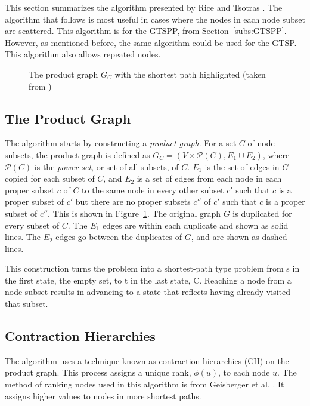 \documentclass{sig-alternate}
\begin{document}
This section summarizes the algorithm presented by Rice and Tsotras \cite{Rice:2013}. The algorithm that follows is most useful in cases where the nodes in each node subset are scattered. This algorithm is for the GTSPP, from Section~\ref{subs:GTSPP}. However, as mentioned before, the same algorithm could be used for the GTSP. This algorithm also allows repeated nodes. 


\begin{figure}
\centering
{}
\caption{The product graph $G_{C}$ with the shortest path highlighted (taken from \cite{Rice:2013})}
\label{fig:productgraph}
\end{figure}

\subsection{The Product Graph}
\label{subs:productgraph}
The algorithm starts by constructing a \textit{product graph}. 
For a set $C$ of node subsets, the product graph is defined as $G_{C}=(V \times \mathcal{P}(C), E_{1} \cup E_{2})$, where $\mathcal{P}(C)$ is the \textit{power set}, or set of all subsets, of $C$. $E_{1}$ is the set of edges in $G$ copied for each subset of $C$, and $E_{2}$ is a set of edges from each node in each proper subset $c$ of $C$ to the same node in every other subset $c'$ such that $c$ is a proper subset of $c'$ but there are no proper subsets $c''$ of $c'$ such that $c$ is a proper subset of $c''$. This is shown in Figure~\ref{fig:productgraph}. The original graph $G$ is duplicated for every subset of $C$. The $E_{1}$ edges are within each duplicate and shown as solid lines. The $E_{2}$ edges go between the duplicates of $G$, and are shown as dashed lines. 

This construction turns the problem into a shortest-path type problem from s in the first state, the empty set, to t in the last state, C. Reaching a node from a node subset results in advancing to a state that reflects having already visited that subset. 

\subsection{Contraction Hierarchies}
\label{subs:CH}
The algorithm uses a technique known as contraction hierarchies (CH) on the product graph. This process assigns a unique rank, $\phi(u)$, to each node $u$. The method of ranking nodes used in this algorithm is from Geisberger et al. \cite{geisberger:2008}. It assigns higher values to nodes in more shortest paths. 
\end{document}
